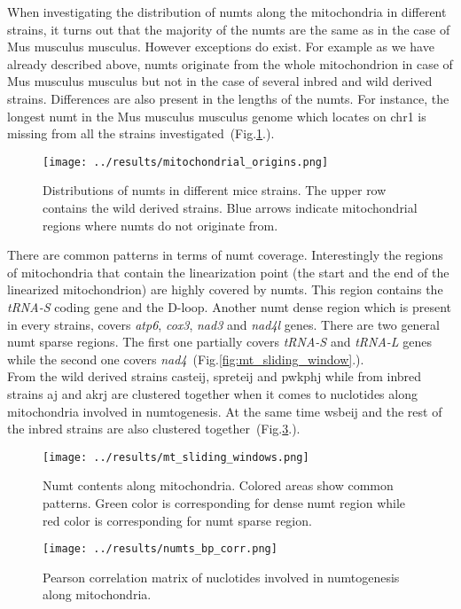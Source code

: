 \documentclass[a4paper,12pt]{article}
\numberwithin{equation}{section} %
\begin{document}
\indent When investigating the distribution of numts along the mitochondria in different strains, it turns out that the majority of the numts are the same as in the case of Mus musculus musculus. However exceptions do exist. For example as we have already described above,  numts originate from the whole mitochondrion in case of Mus musculus musculus but not in the case of several inbred and wild derived strains. Differences are also present in the lengths of the numts. For instance, the longest numt in the Mus musculus musculus genome which locates on chr1 is missing from all the strains investigated~(Fig.\ref{fig:mitochondrial_origins}.). 
\begin{figure}[H]
    \centering
    \captionsetup{justification=centering}
    \texttt{[image: ../results/mitochondrial\_origins.png]}
    \caption{Distributions of numts in different mice strains. The upper row contains the wild derived strains. Blue arrows indicate mitochondrial regions where numts do not originate from.}
    \label{fig:mitochondrial_origins}
\end{figure}

\indent There are common patterns in terms of  numt coverage. Interestingly the regions of mitochondria that contain the linearization point (the start and the end of the linearized mitochondrion) are highly covered by numts. This region contains the \textit{tRNA-S} coding gene and the D-loop. Another numt dense region which is present in every strains, covers \textit{atp6}, \textit{cox3}, \textit{nad3} and \textit{nad4l} genes. There are two general numt sparse regions. The first one partially covers \textit{tRNA-S} and \textit{tRNA-L} genes while the second one covers \textit{nad4}~(Fig.\ref{fig:mt_sliding_window}.).\\ \indent From the wild derived strains casteij, spreteij and pwkphj while from inbred strains aj and akrj are clustered together when it comes to nuclotides along mitochondria involved in numtogenesis. At the same time wsbeij and the rest of the inbred strains are also clustered together~(Fig.\ref{fig:numts_bp_corr}.).
\begin{figure}[H]
    \centering
    \captionsetup{justification=centering}
    \texttt{[image: ../results/mt\_sliding\_windows.png]}
    \caption{Numt contents along mitochondria. Colored areas show common patterns. Green color is corresponding for dense numt region while red color is corresponding for numt sparse region.}
    \label{fig:mt_sliding_windows}
\end{figure}
\begin{figure}[H]
    \centering
    \captionsetup{justification=centering}
    \texttt{[image: ../results/numts\_bp\_corr.png]}
    \caption{Pearson correlation matrix of nuclotides involved in numtogenesis along mitochondria.}
    \label{fig:numts_bp_corr}
\end{figure}
\end{document}
